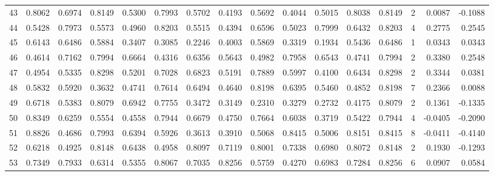 \begin{tabular}{lrrrrrrrrrrrrrrr}
43  &      0.8062 &  0.6974 &  0.8149 &  0.5300 &  0.7993 &  0.5702 &  0.4193 &  0.5692 &  0.4044 &  0.5015 &   0.8038 &     0.8149 &      2 &                    0.0087 &                    -0.1088 \\
44  &      0.5428 &  0.7973 &  0.5573 &  0.4960 &  0.8203 &  0.5515 &  0.4394 &  0.6596 &  0.5023 &  0.7999 &   0.6432 &     0.8203 &      4 &                    0.2775 &                     0.2545 \\
45  &      0.6143 &  0.6486 &  0.5884 &  0.3407 &  0.3085 &  0.2246 &  0.4003 &  0.5869 &  0.3319 &  0.1934 &   0.5436 &     0.6486 &      1 &                    0.0343 &                     0.0343 \\
46  &      0.4614 &  0.7162 &  0.7994 &  0.6664 &  0.4316 &  0.6356 &  0.5643 &  0.4982 &  0.7958 &  0.6543 &   0.4741 &     0.7994 &      2 &                    0.3380 &                     0.2548 \\
47  &      0.4954 &  0.5335 &  0.8298 &  0.5201 &  0.7028 &  0.6823 &  0.5191 &  0.7889 &  0.5997 &  0.4100 &   0.6434 &     0.8298 &      2 &                    0.3344 &                     0.0381 \\
48  &      0.5832 &  0.5920 &  0.3632 &  0.4741 &  0.7614 &  0.6494 &  0.4640 &  0.8198 &  0.6395 &  0.5460 &   0.4852 &     0.8198 &      7 &                    0.2366 &                     0.0088 \\
49  &      0.6718 &  0.5383 &  0.8079 &  0.6942 &  0.7755 &  0.3472 &  0.3149 &  0.2310 &  0.3279 &  0.2732 &   0.4175 &     0.8079 &      2 &                    0.1361 &                    -0.1335 \\
50  &      0.8349 &  0.6259 &  0.5554 &  0.4558 &  0.7944 &  0.6679 &  0.4750 &  0.7664 &  0.6038 &  0.3719 &   0.5422 &     0.7944 &      4 &                   -0.0405 &                    -0.2090 \\
51  &      0.8826 &  0.4686 &  0.7993 &  0.6394 &  0.5926 &  0.3613 &  0.3910 &  0.5068 &  0.8415 &  0.5006 &   0.8151 &     0.8415 &      8 &                   -0.0411 &                    -0.4140 \\
52  &      0.6218 &  0.4925 &  0.8148 &  0.6438 &  0.4958 &  0.8097 &  0.7119 &  0.8001 &  0.7338 &  0.6980 &   0.8072 &     0.8148 &      2 &                    0.1930 &                    -0.1293 \\
53  &      0.7349 &  0.7933 &  0.6314 &  0.5355 &  0.8067 &  0.7035 &  0.8256 &  0.5759 &  0.4270 &  0.6983 &   0.7284 &     0.8256 &      6 &                    0.0907 &                     0.0584 \\

\end{tabular}
